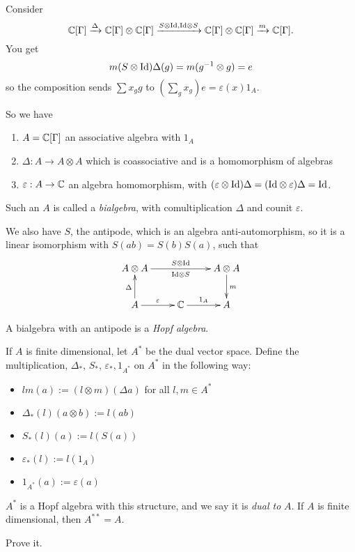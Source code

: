  Consider
 \[
    \mathbb{C}[\Gamma]\xrightarrow{\Delta} \mathbb{C}[\Gamma]\otimes \mathbb{C}[\Gamma]
    \xrightarrow{S\otimes\mathrm{Id},\mathrm{Id}\otimes S} \mathbb{C}[\Gamma]\otimes
    \mathbb{C}[\Gamma]\xrightarrow{m} \mathbb{C}[\Gamma].
 \]
 You get
 \[
   m(S\otimes \mathrm{Id})\Delta(g) = m(g^{-1}\otimes g) = e
 \]
 so the composition sends $\sum x_g g$ to $(\sum_g x_g) e = \varepsilon(x)1_A$.

 So we have
 \begin{enumerate}
 \item $A=\mathbb{C}[\Gamma]$ an associative algebra with $1_A$
 \item $\Delta:A\to A\otimes A$ which is coassociative and is a homomorphism of
 algebras
 \item $\varepsilon: A\to \mathbb{C}$ an algebra homomorphism, with $(\varepsilon\otimes
 \mathrm{Id})\Delta = (\mathrm{Id}\otimes \varepsilon)\Delta = \mathrm{Id}$.
 \end{enumerate}

 \begin{definition}Such an $A$ is called a \emph{bialgebra}, with
  comultiplication $\Delta$ and counit $\varepsilon$.
 \end{definition}

 We also have $S$, the antipode, which is an algebra anti-automorphism, so it is a
 linear isomorphism with $S(ab)=S(b)S(a)$, such that
 \[\xymatrix{
  A\otimes A \ar[rr]^{S\otimes\id}_{\id\otimes S} & & A\otimes A \ar[d]^m \\
  A\ar[u]^{\Delta}\ar[r]^{\varepsilon} & \CC\ar[r]^{1_A} & A
 }\]
 \begin{definition}
   A bialgebra with an antipode is a \emph{Hopf algebra}.
 \end{definition}

  If $A$ is finite dimensional, let $A^*$ be the dual vector space. Define the
  multiplication, $\Delta_*$, $S_*$, $\varepsilon_*, 1_{A^*}$ on $A^*$ in the following
  way:
 \begin{itemize}
 \item $lm(a):=(l\otimes m)(\Delta a)$ for all $l,m\in A^*$
 \item $\Delta_*(l)(a\otimes b):= l(ab)$
 \item $S_*(l)(a) := l(S(a))$
 \item $\varepsilon_*(l) := l(1_A)$
 \item $1_{A^*}(a) := \varepsilon(a)$
 \end{itemize}

 \begin{theorem}
   $A^*$ is a Hopf algebra with this structure, and we say it is \emph{dual to} $A$.
   If $A$ is finite dimensional, then $A^{**}=A$.
 \end{theorem}
 \begin{exercise}
   Prove it.
 \end{exercise}

